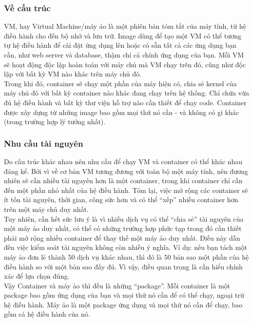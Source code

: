 \documentclass[14pt,a4paper]{report}
\begin{document}
	\subsubsection{Về cấu trúc}
	\hspace{1cm}VM, hay Virtual Machine/máy ảo là một phiên bản tóm tắt của máy tính, từ hệ điều hành cho đến bộ nhớ và lưu trữ. Image dùng để tạo một VM có thể tương tự hệ điều hành để cài đặt ứng dụng lên hoặc có sẵn tất cả các ứng dụng bạn cần, như web server và database, thậm chí cả chính ứng dụng của bạn. Mỗi VM sẽ hoạt động độc lập hoàn toàn với máy chủ mà VM chạy trên đó, cũng như độc lập với bất kỳ VM nào khác trên máy chủ đó.\\
	
	\hspace{0.3cm}Trong khi đó, container sẽ chạy một phần của máy hiện có, chia sẻ kernel của máy chủ đó với bất kỳ container nào khác đang chạy trên hệ thống. Chỉ chứa vừa đủ hệ điều hành và bất kỳ thư viện hỗ trợ nào cần thiết để chạy code. Container được xây dựng từ những image bao gồm mọi thứ nó cần - và không có gì khác (trong trường hợp lý tưởng nhất).\\
	\subsubsection{Nhu cầu tài nguyên}
	\hspace{1cm}Do cấu trúc khác nhau nên nhu cầu để chạy VM và container có thể khác nhau đáng kể. Bởi vì về cơ bản VM tương đương với toàn bộ một máy tính, nên đương nhiên sẽ cần nhiều tài nguyên hơn là một container, trong khi container chỉ cần đến một phần nhỏ nhất của hệ điều hành. Tóm lại, việc mở rộng các container sẽ ít tốn tài nguyên, thời gian, công sức hơn và có thể “xếp” nhiều container hơn trên một máy chủ duy nhất.\\
	
	\hspace{0.3cm}Tuy nhiên, cần hết sức lưu ý là vì nhiều dịch vụ có thể “chia sẻ” tài nguyên của một máy ảo duy nhất, có thể có những trường hợp phức tạp trong đó cần thiết phải mở rộng nhiều container để thay thế một máy ảo duy nhất. Điều này dẫn đến việc kiểm soát tài nguyên không còn nhiều ý nghĩa. Ví dụ: nếu bạn tách một máy ảo đơn lẻ thành 50 dịch vụ khác nhau, thì đó là 50 bản sao một phần của hệ điều hành so với một bản sao đầy đủ. Vì vậy, điều quan trọng là cần hiểu chính xác để lựa chọn đúng.\\
	
	\hspace{0.3cm}Vậy Container và máy ảo thì đều là những “package”. Mỗi container là một package bao gồm ứng dụng của bạn và mọi thứ nó cần để có thể chạy, ngoại trừ hệ điều hành. Máy ảo là một package ứng dụng và mọi thứ nó cần để chạy, bao gồm cả hệ điều hành của nó.\\
	
\end{document}
